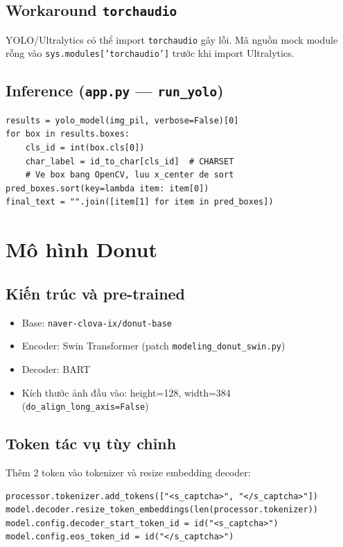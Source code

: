 \documentclass[a4paper,12pt]{report}
\begin{document}
\section{Workaround \texttt{torchaudio}}
YOLO/Ultralytics có thể import \texttt{torchaudio} gây lỗi. Mã nguồn mock module rỗng vào \texttt{sys.modules['torchaudio']} trước khi import Ultralytics.

\section{Inference (\texttt{app.py} --- \texttt{run\_yolo})}
\begin{lstlisting}
results = yolo_model(img_pil, verbose=False)[0]
for box in results.boxes:
    cls_id = int(box.cls[0])
    char_label = id_to_char[cls_id]  # CHARSET
    # Ve box bang OpenCV, luu x_center de sort
pred_boxes.sort(key=lambda item: item[0])
final_text = "".join([item[1] for item in pred_boxes])
\end{lstlisting}

\chapter{Mô hình Donut}

\section{Kiến trúc và pre-trained}
\begin{itemize}[leftmargin=*]
  \item Base: \texttt{naver-clova-ix/donut-base}
  \item Encoder: Swin Transformer (patch \texttt{modeling\_donut\_swin.py})
  \item Decoder: BART
  \item Kích thước ảnh đầu vào: height=128, width=384 (\texttt{do\_align\_long\_axis=False})
\end{itemize}

\section{Token tác vụ tùy chỉnh}
Thêm 2 token vào tokenizer và resize embedding decoder:
\begin{lstlisting}
processor.tokenizer.add_tokens(["<s_captcha>", "</s_captcha>"])
model.decoder.resize_token_embeddings(len(processor.tokenizer))
model.config.decoder_start_token_id = id("<s_captcha>")
model.config.eos_token_id = id("</s_captcha>")
\end{lstlisting}
\end{document}
